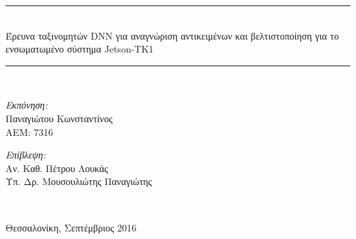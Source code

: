 \begin{titlepage}
\begin{center}
    \rule{450pt}{4pt} \\[0.4cm]
    {\fontsize{20.26pt}{1em}\selectfont Έρευνα ταξινομητών DNN για αναγνώριση αντικειμένων και βελτιστοποίηση για το ενσωματωμένο σύστημα Jetson-TK1}

    \rule{350pt}{4pt} \\[4cm]

    \begin{minipage}{0.4\textwidth}
      \begin{flushleft} \large
        \emph{Εκπόνηση:} \\
        Παναγιώτου Κωνσταντίνος \\
        ΑΕΜ: 7316
      \end{flushleft}
    \end{minipage}
    \begin{minipage}{0.4\textwidth}
      \begin{flushright} \large
        \emph{Επίβλεψη:} \\
        Αν. Καθ. Πέτρου Λουκάς\\
        Υπ. Δρ. Μουσουλιώτης Παναγιώτης \\
      \end{flushright}
    \end{minipage}
    \\[1cm]
    \vfill

    \large Θεσσαλονίκη, Σεπτέμβριος 2016

  \end{center}
\end{titlepage}
